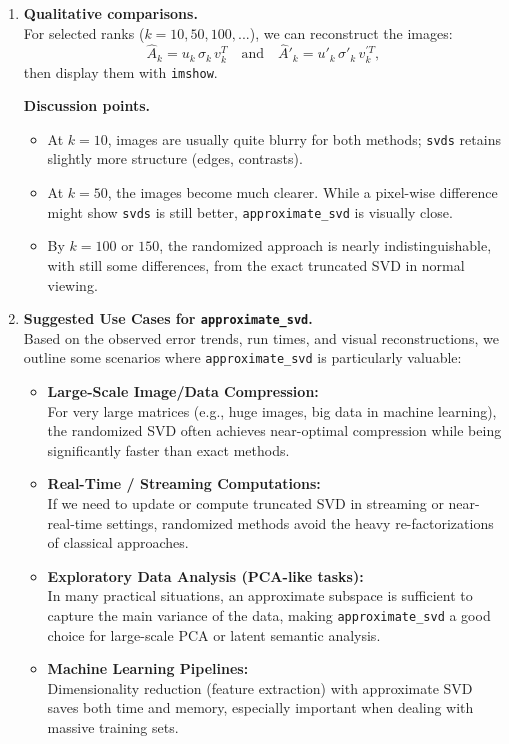 \documentclass[11pt,a4paper, margin=1in]{article}
\begin{document}
\begin{enumerate}
    \item \textbf{Qualitative comparisons.} \\
    For selected ranks ($k=10, 50, 100, ...$), we can reconstruct
    the images:
    \[
      \hat{A}_{k} = u_{k}\,\sigma_{k}\,v_{k}^{T}
      \quad \text{and} \quad
      \hat{A}'_{k} = u'_{k}\,\sigma'_{k}\,v_{k}^{'T},
    \]
    then display them with \texttt{imshow}. 

    \textbf{Discussion points.}
    \begin{itemize}
      \item At $k=10$, images are usually quite blurry for both methods; 
      \texttt{svds} retains slightly more structure (edges, contrasts).
      
      \item At $k=50$, the images become much clearer. While a pixel-wise difference might show 
      \texttt{svds} is still better, \texttt{approximate\_svd} is visually close.
      
      \item By $k=100$ or $150$, the randomized approach is nearly indistinguishable, with still some differences, 
      from the exact truncated SVD in normal viewing.
    \end{itemize}

    \item \textbf{Suggested Use Cases for \texttt{approximate\_svd}.}\\
    Based on the observed error trends, run times, and visual reconstructions, 
    we outline some scenarios where \texttt{approximate\_svd} is particularly valuable:
    \begin{itemize}
      \item \textbf{Large-Scale Image/Data Compression:} \\
      For very large matrices (e.g., huge images, big data in machine learning), 
      the randomized SVD often achieves near-optimal compression while 
      being significantly faster than exact methods.
      
      \item \textbf{Real-Time / Streaming Computations:} \\
      If we need to update or compute truncated SVD in streaming or near-real-time settings, 
      randomized methods avoid the heavy re-factorizations of classical approaches.
      
      \item \textbf{Exploratory Data Analysis (PCA-like tasks):} \\
      In many practical situations, an approximate subspace is sufficient to capture 
      the main variance of the data, making \texttt{approximate\_svd} a good choice 
      for large-scale PCA or latent semantic analysis.
      
      \item \textbf{Machine Learning Pipelines:} \\
      Dimensionality reduction (feature extraction) with approximate SVD 
      saves both time and memory, especially important when dealing with 
      massive training sets. 
    \end{itemize}

\end{enumerate}
\end{document}
